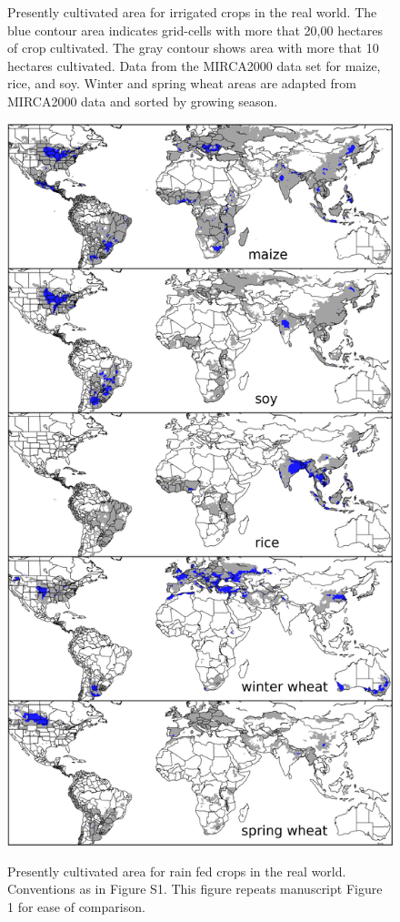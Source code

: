 \documentclass[10pt]{article}
\begin{document}
\begin{figure}[h!]
\begin{minipage}{.45\textwidth}
    \caption{Presently cultivated area for irrigated crops in the real world. The blue contour area indicates grid-cells with more that 20,00 hectares of crop cultivated. The gray contour shows area with more that 10 hectares cultivated. Data from the MIRCA2000 data set for maize, rice, and soy. Winter and spring wheat areas are adapted from MIRCA2000 data and sorted by growing season.}
    \label{fig:irrarea}
\end{minipage}
\hspace{.05\linewidth}
\begin{minipage}{.45\textwidth}
    \centering
    \vspace{-19mm}
    \includegraphics[width=\textwidth]{s_croparea.png}\\
    \caption{Presently cultivated area for rain fed crops in the real world. Conventions as in Figure S1. This figure repeats manuscript Figure 1 for ease of comparison.}
    \label{fig:rainfed}
\end{minipage}
\end{figure}
\end{document}
